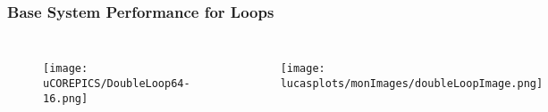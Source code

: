 \documentclass{beamer}
\begin{document}
\begin{frame}
\frametitle{Base System Performance for Loops}





\begin{columns}[c]

\begin{figure}

\texttt{[image: uCOREPICS/DoubleLoop64-16.png]}
\end{figure}


\begin{figure}
\texttt{[image: lucasplots/monImages/doubleLoopImage.png]}
\end{figure}

\end{columns}

\begin{itemize}

\end{itemize}

\end{frame}

\end{document}
